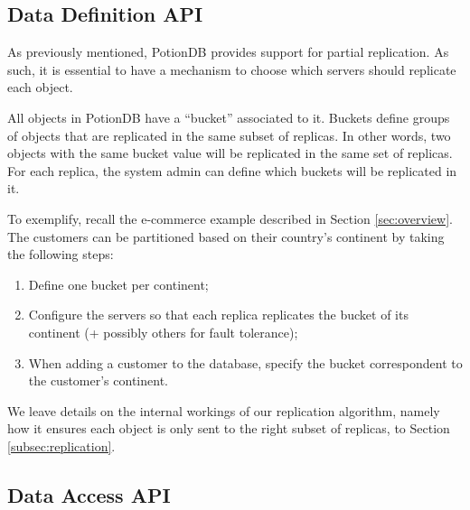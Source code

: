 \documentclass{vldb}
\begin{document}
\subsection{Data Definition API}
\label{subsec:old_dataAPI}

As previously mentioned, PotionDB provides support for partial replication.
As such, it is essential to have a mechanism to choose which servers should replicate each object.

All objects in PotionDB have a ``bucket'' associated to it.
Buckets define groups of objects that are replicated in the same subset of replicas. In other words, two objects with the same bucket value will be replicated in the same set of replicas.
For each replica, the system admin can define which buckets will be replicated in it.

To exemplify, recall the e-commerce example described in Section \ref{sec:overview}.
The customers can be partitioned based on their country's continent by taking the following steps: 

\begin{enumerate}
	\item Define one bucket per continent;
	\item Configure the servers so that each replica replicates the bucket of its continent (+ possibly others for fault tolerance);
	\item When adding a customer to the database, specify the bucket correspondent to the customer's continent.
\end{enumerate}

We leave details on the internal workings of our replication algorithm, namely how it ensures each object is only sent to the right subset of replicas, to Section \ref{subsec:replication}.





\subsection{Data Access API}
\end{document}
